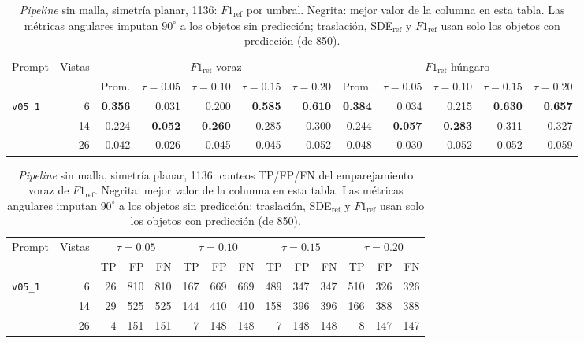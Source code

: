 \begin{table}[htbp]
\centering
\caption{\textit{Pipeline} sin malla, simetría planar, 1136: $F1_{\mathrm{ref}}$ por umbral. Negrita: mejor valor de la columna en esta tabla. Las métricas angulares imputan $90^\circ$ a los objetos sin predicción; traslación, SDE$_{\mathrm{ref}}$ y $F1_{\mathrm{ref}}$ usan solo los objetos con predicción (de 850).}
\label{tab:plane_1136_f1}
\begin{adjustbox}{max width=\textwidth}
\begin{tabular}{lrrrrrrrrrrr}
\toprule
\multirow{2}{*}{Prompt} & \multirow{2}{*}{Vistas} & \multicolumn{5}{c}{$F1_{\mathrm{ref}}$ voraz} & \multicolumn{5}{c}{$F1_{\mathrm{ref}}$ húngaro} \\
\cmidrule(lr){3-7} \cmidrule(lr){8-12}
 &  & Prom. & $\tau{=}0.05$ & $\tau{=}0.10$ & $\tau{=}0.15$ & $\tau{=}0.20$ & Prom. & $\tau{=}0.05$ & $\tau{=}0.10$ & $\tau{=}0.15$ & $\tau{=}0.20$ \\
\midrule
\multirow{3}{*}{\texttt{v05\_1}} & 6 & \textbf{0.356} & 0.031 & 0.200 & \textbf{0.585} & \textbf{0.610} & \textbf{0.384} & 0.034 & 0.215 & \textbf{0.630} & \textbf{0.657} \\
 & 14 & 0.224 & \textbf{0.052} & \textbf{0.260} & 0.285 & 0.300 & 0.244 & \textbf{0.057} & \textbf{0.283} & 0.311 & 0.327 \\
 & 26 & 0.042 & 0.026 & 0.045 & 0.045 & 0.052 & 0.048 & 0.030 & 0.052 & 0.052 & 0.059 \\
\bottomrule
\end{tabular}
\end{adjustbox}
\end{table}

\begin{table}[htbp]
\centering
\caption{\textit{Pipeline} sin malla, simetría planar, 1136: conteos TP/FP/FN del emparejamiento voraz de $F1_{\mathrm{ref}}$. Negrita: mejor valor de la columna en esta tabla. Las métricas angulares imputan $90^\circ$ a los objetos sin predicción; traslación, SDE$_{\mathrm{ref}}$ y $F1_{\mathrm{ref}}$ usan solo los objetos con predicción (de 850).}
\label{tab:plane_1136_conteos}
\begin{adjustbox}{max width=\textwidth}
\begin{tabular}{lrrrrrrrrrrrrr}
\toprule
\multirow{2}{*}{Prompt} & \multirow{2}{*}{Vistas} & \multicolumn{3}{c}{$\tau{=}0.05$} & \multicolumn{3}{c}{$\tau{=}0.10$} & \multicolumn{3}{c}{$\tau{=}0.15$} & \multicolumn{3}{c}{$\tau{=}0.20$} \\
\cmidrule(lr){3-5} \cmidrule(lr){6-8} \cmidrule(lr){9-11} \cmidrule(lr){12-14}
 &  & TP & FP & FN & TP & FP & FN & TP & FP & FN & TP & FP & FN \\
\midrule
\multirow{3}{*}{\texttt{v05\_1}} & 6 & 26 & 810 & 810 & 167 & 669 & 669 & 489 & 347 & 347 & 510 & 326 & 326 \\
 & 14 & 29 & 525 & 525 & 144 & 410 & 410 & 158 & 396 & 396 & 166 & 388 & 388 \\
 & 26 & 4 & 151 & 151 & 7 & 148 & 148 & 7 & 148 & 148 & 8 & 147 & 147 \\
\bottomrule
\end{tabular}
\end{adjustbox}
\end{table}

